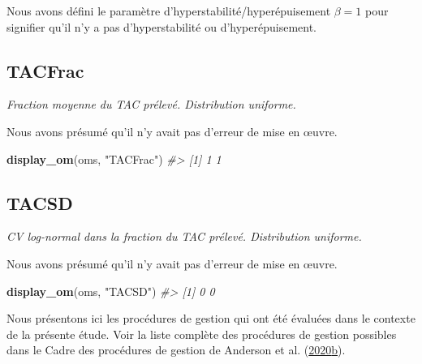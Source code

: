 \documentclass[11pt]{book}
\newenvironment{Shaded}{\begin{snugshade}}{\end{snugshade}}
\newcommand{\CommentTok}[1]{\textcolor[rgb]{0.56,0.35,0.01}{\textit{#1}}}
\newcommand{\KeywordTok}[1]{\textcolor[rgb]{0.13,0.29,0.53}{\textbf{#1}}}
\newcommand{\NormalTok}[1]{#1}
\newcommand{\StringTok}[1]{\textcolor[rgb]{0.31,0.60,0.02}{#1}}
\begin{document}
Nous avons défini le paramètre d'hyperstabilité/hyperépuisement \(\beta = 1\) pour signifier qu'il n'y a pas d'hyperstabilité ou d'hyperépuisement.

\label{app:desc-imp-yelloweye}

\label{app:desc-imp-tacfrac-yelloweye}
\subsection{TACFrac}

\emph{Fraction moyenne du TAC prélevé. Distribution uniforme.}

Nous avons présumé qu'il n'y avait pas d'erreur de mise en œuvre.
\begin{Shaded}
\begin{Highlighting}[]
\KeywordTok{display_om}\NormalTok{(oms, }\StringTok{"TACFrac"}\NormalTok{)}
\CommentTok{#> [1] 1 1}
\end{Highlighting}
\end{Shaded}
\label{app:desc-imp-tacsd-yelloweye}
\subsection{TACSD}

\emph{CV log-normal dans la fraction du TAC prélevé. Distribution uniforme.}

Nous avons présumé qu'il n'y avait pas d'erreur de mise en œuvre.
\begin{Shaded}
\begin{Highlighting}[]
\KeywordTok{display_om}\NormalTok{(oms, }\StringTok{"TACSD"}\NormalTok{)}
\CommentTok{#> [1] 0 0}
\end{Highlighting}
\end{Shaded}
\newpage


\clearpage

\label{app:mps}

Nous présentons ici les procédures de gestion qui ont été évaluées dans le contexte de la présente étude. Voir la liste complète des procédures de gestion possibles dans le Cadre des procédures de gestion de Anderson et al. (\protect\hyperlink{ref-anderson2020gfmp}{2020}\protect\hyperlink{ref-anderson2020gfmp}{b}).

\hypertarget{sec:mp-cc}{%
\label{sec:mp-cc}}
\end{document}
